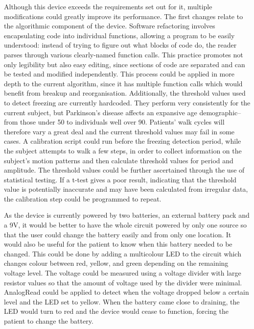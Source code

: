 \documentclass[titlepage]{article}
\begin{document}
\begin{doublespacing}
Although this device exceeds the requirements set out for it, multiple modifications could greatly improve its performance. The first changes relate to the algorithmic component of the device. Software refactoring involves encapsulating code into individual functions, allowing a program to be easily understood: instead of trying to figure out what blocks of code do, the reader parses through various clearly-named function calls. This practice promotes not only legibility but also easy editing, since sections of code are separated and can be tested and modified independently. This process could be applied in more depth to the current algorithm, since it has multiple function calls which would benefit from breakup and reorganisation.
Additionally, the threshold values used to detect freezing are currently hardcoded. They perform very consistently for the current subject, but Parkinson's disease affects an expansive age demographic--from those under 50 to individuals well over 90. Patients' walk cycles will therefore vary a great deal and the current threshold values may fail in some cases. A calibration script could run before the freezing detection period, while the subject attempts to walk a few steps, in order to collect information on the subject's motion patterns and then calculate threshold values for period and amplitude. The threshold values could be further ascertained through the use of statistical testing. If a t-test gives a poor result, indicating that the threshold value is potentially inaccurate and may have been calculated from irregular data, the calibration step could be programmed to repeat.

    As the device is currently powered by two batteries, an external battery pack and a 9V, it would be better to have the whole circuit powered by only one source so that the user could change the battery easily and from only one location. It would also be useful for the patient to know when this battery needed to be changed. This could be done by adding a multicolour LED to the circuit which changes colour between red, yellow, and green depending on the remaining voltage level. The voltage could be measured using a voltage divider with large resistor values so that the amount of voltage used by the divider were minimal. AnalogRead could be applied to detect when the voltage dropped below a certain level and the LED set to yellow. When the battery came close to draining, the LED would turn to red and the device would cease to function, forcing the patient to change the battery. 


\end{doublespacing}
\end{document}
